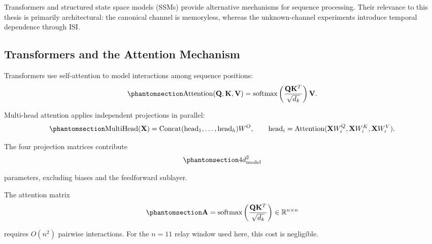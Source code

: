 Transformers and structured state space models (SSMs) provide alternative mechanisms for sequence processing. Their relevance to this thesis is primarily architectural: the canonical channel is memoryless, whereas the unknown-channel experiments introduce temporal dependence through ISI.

\subsection{Transformers and the Attention Mechanism}\label{sec:transformers-and-the-attention-mechanism}

Transformers \cite{Vaswani2017Attention} use self-attention to model interactions among sequence positions:
\begin{equation}\protect\phantomsection\label{eq:attention}
\text{Attention}(\mathbf{Q},\mathbf{K},\mathbf{V})
=
\text{softmax}
\left(
\frac{\mathbf{Q}\mathbf{K}^{T}}{\sqrt{d_k}}
\right)
\mathbf{V}.
\end{equation}

Multi-head attention applies independent projections in parallel:
\begin{equation}\protect\phantomsection\label{eq:multihead-attention}
\text{MultiHead}(\mathbf{X})
=
\text{Concat}(\text{head}_1,\ldots,\text{head}_h)W^O,
\qquad
\text{head}_i
=
\text{Attention}
(\mathbf{X}W_i^Q,\mathbf{X}W_i^K,\mathbf{X}W_i^V).
\end{equation}

The four projection matrices contribute
\begin{equation}\protect\phantomsection\label{eq:multihead-attention-parameters-count}
4d_{\text{model}}^2
\end{equation}
parameters, excluding biases and the feedforward sublayer.

The attention matrix
\begin{equation}\protect\phantomsection\label{eq:multihead-attention-matrix}
\mathbf{A}
=
\text{softmax}
\left(
\frac{\mathbf{Q}\mathbf{K}^{T}}{\sqrt{d_k}}
\right)
\in\mathbb{R}^{n\times n}
\end{equation}
requires \(O(n^2)\) pairwise interactions. For the \(n=11\) relay window used here, this cost is negligible.

